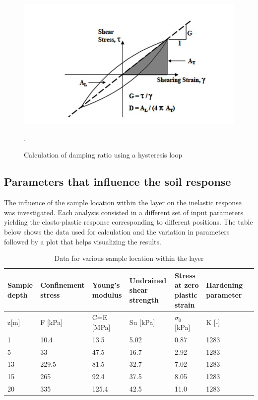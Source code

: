 \documentclass[11pt,a4paper]{report}
\begin{document}
\begin{figure}[h!]
	\centering
	\includegraphics[width=0.4\linewidth]{"loop"}
	\caption{Calculation of damping ratio using a hysteresis loop}
	\label{loop}.
\end{figure}

\newpage
\subsection{Parameters that influence the soil response}
The influence of the sample location within the layer on the inelastic response was investigated. Each analysis consisted in a different set of input parameters yielding the elasto-plastic response corresponding to different positions. The table below shows the data used for calculation and the variation in parameters followed by a plot that helps visualizing the results. 

\begin{table}[h!]
	\centering
	\begin{tabular}{|p{2cm}|p{2cm}|p{2cm}| p{3cm}|p{2cm}|p{2cm}|p{2cm}|}
		\hline Sample depth &Confinement stress & Young's modulus  & Undrained shear strength &  Stress at zero plastic strain & Hardening parameter\\
		\hline  z[m]  & F [kPa]  & C=E [MPa] & Su [kPa] & $\sigma_0$ [kPa]  & K [-] \\
		\hline 1    & 10.4 & 13.5 & 5.02 & 0.87 &  1283 \\ 
		\hline 5  & 33  &  47.5 & 16.7 & 2.92  & 1283\\ 
		\hline 13  &  229.5  &  81.5  & 32.7 & 7.02  &  1283\\ 
		\hline 15 &  265  &  92.4  & 37.5 & 8.05  & 1283\\ 
		\hline 20 &  335  &    125.4  & 42.5 &  11.0  & 1283 \\ 
		\hline
	\end{tabular}
	\caption{Data for various sample location within the layer}
	\label{Table2}
\end{table}
\end{document}
